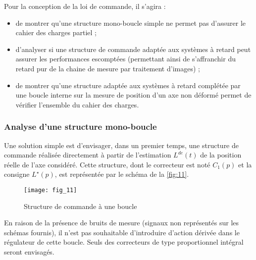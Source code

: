 Pour la conception de la loi de commande, il s’agira :
\begin{itemize}
\item de montrer qu’une structure mono-boucle simple ne permet pas d’assurer le cahier des charges partiel ;
\item d’analyser si une structure de commande adaptée aux systèmes à retard peut assurer les performances
escomptées (permettant ainsi de s’affranchir du retard pur de la chaine de mesure par traitement d’images) ;
\item de montrer qu’une structure adaptée aux systèmes à retard complétée par une boucle interne sur la mesure
de position d’un axe non déformé permet de vérifier l’ensemble du cahier des charges.
\end{itemize}

\subsubsection{Analyse d’une structure mono-boucle}

Une solution simple est d’envisager, dans un premier temps, une structure de commande réalisée directement à
partir de l’estimation $L^{de}(t)$ de la position réelle de l’axe considéré. Cette structure, dont le correcteur est noté
$C_1(p)$ et la consigne $L^{\star}(p)$, est représentée par le schéma de la \autoref{fig:11}.


\begin{figure}[H]
\centering
\texttt{[image: fig\_11]}
\caption{\label{fig:11}  Structure de commande à une boucle}
\end{figure}

En raison de la présence de bruits de mesure (signaux non représentés sur les schémas fournis), il n’est pas
souhaitable d’introduire d’action dérivée dans le régulateur de cette boucle. Seuls des correcteurs de type
proportionnel intégral seront envisagés.

\ifprof
\begin{corrige}
\end{corrige}
\else
\fi



